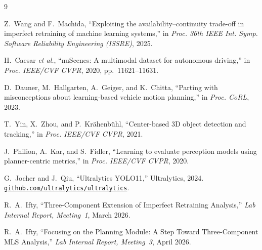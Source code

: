 \documentclass[11pt,a4paper]{article}
\begin{document}

\begin{thebibliography}{9}

Z.~Wang and F.~Machida, ``Exploiting the availability--continuity
trade-off in imperfect retraining of machine learning systems,''
in \textit{Proc. 36th IEEE Int. Symp. Software Reliability
Engineering (ISSRE)}, 2025.

H.~Caesar \textit{et al.}, ``nuScenes: A multimodal dataset for
autonomous driving,'' in \textit{Proc. IEEE/CVF CVPR}, 2020,
pp.~11621--11631.

D.~Dauner, M.~Hallgarten, A.~Geiger, and K.~Chitta, ``Parting with
misconceptions about learning-based vehicle motion planning,''
in \textit{Proc. CoRL}, 2023.

T.~Yin, X.~Zhou, and P.~Kr\"ahenb\"uhl, ``Center-based 3D object
detection and tracking,'' in \textit{Proc. IEEE/CVF CVPR}, 2021.

J.~Philion, A.~Kar, and S.~Fidler, ``Learning to evaluate perception
models using planner-centric metrics,'' in
\textit{Proc. IEEE/CVF CVPR}, 2020.

G.~Jocher and J.~Qiu, ``Ultralytics YOLO11,'' Ultralytics, 2024.
\href{https://github.com/ultralytics/ultralytics}{\texttt{github.com/ultralytics/ultralytics}}.

R.~A.~Ifty, ``Three-Component Extension of Imperfect Retraining
Analysis,'' \textit{Lab Internal Report, Meeting~1}, March 2026.

R.~A.~Ifty, ``Focusing on the Planning Module: A Step Toward
Three-Component MLS Analysis,'' \textit{Lab Internal Report,
Meeting~3}, April 2026.

\end{thebibliography}
\end{document}
